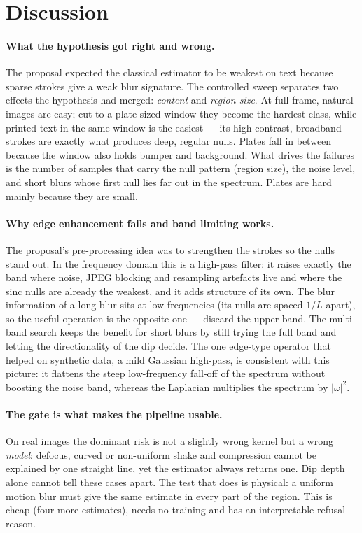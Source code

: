 \section{Discussion}
\label{sec:discussion}

\paragraph{What the hypothesis got right and wrong.} The proposal expected the classical estimator
to be weakest on text because sparse strokes give a weak blur signature. The controlled sweep
separates two effects the hypothesis had merged: \emph{content} and \emph{region size}. At full
frame, natural images are easy; cut to a plate-sized window they become the hardest class, while
printed text in the same window is the easiest --- its high-contrast, broadband strokes are exactly
what produces deep, regular nulls. Plates fall in between because the window also holds bumper and
background. What drives the failures is the number of samples that carry the null pattern (region
size), the noise level, and short blurs whose first null lies far out in the spectrum. Plates are
hard mainly because they are small.

\paragraph{Why edge enhancement fails and band limiting works.} The proposal's pre-processing idea
was to strengthen the strokes so the nulls stand out. In the frequency domain this is a high-pass
filter: it raises exactly the band where noise, JPEG blocking and resampling artefacts live and
where the sinc nulls are already the weakest, and it adds structure of its own. The blur
information of a long blur sits at low frequencies (its nulls are spaced $1/L$ apart), so the useful
operation is the opposite one --- discard the upper band. The multi-band search keeps the benefit
for short blurs by still trying the full band and letting the directionality of the dip decide.
The one edge-type operator that helped on synthetic data, a mild Gaussian high-pass, is consistent
with this picture: it flattens the steep low-frequency fall-off of the spectrum without boosting
the noise band, whereas the Laplacian multiplies the spectrum by $|\omega|^2$.

\paragraph{The gate is what makes the pipeline usable.} On real images the dominant risk is not a
slightly wrong kernel but a wrong \emph{model}: defocus, curved or non-uniform shake and compression
cannot be explained by one straight line, yet the estimator always returns one. Dip depth alone
cannot tell these cases apart. The test that does is physical: a uniform motion blur must give the
same estimate in every part of the region. This is cheap (four more estimates), needs no training
and has an interpretable refusal reason.

